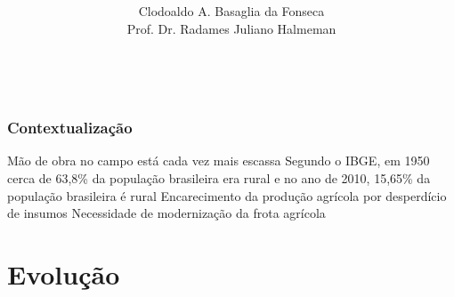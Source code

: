 \documentclass{beamer}
\title[\idsubjectcourseinstitution] %
{\texttt{\classnumber} \classtitle}
\subtitle{\classsubtitle}
\author[Clodoaldo da Fonseca] %
{\\\\Clodoaldo A. Basaglia da Fonseca \\Prof. Dr. Radames Juliano Halmeman
	\texttt{}\\
 \and
 \inst{}\\
    \texttt{}
}
\institute[] %
{
  \universityname \\
  \departmentname \\
  \citystatecountry
  \and
  \large
  \textbf{\coursename}
  
  \vspace{-1.0cm}
}
\date[\today] %
{\vspace{-1.5cm} \texttt{\subjectname}}
\begin{document}

{

	\vspace{0.5cm}
	\begin{frame}
		\maketitle
	\end{frame}
}


\vspace{0.5cm}





\begin{frame}
\frametitle{Contextualização}
\begin{outline}
 \1 Mão de obra no campo está cada vez mais escassa
 \2 Segundo o IBGE, em 1950 cerca de 63,8\% da população brasileira era rural e no ano de 2010,  15,65\% da população brasileira é rural
 \1 Encarecimento da produção agrícola por desperdício de insumos
 \1 Necessidade de modernização da frota agrícola
\end{outline}
\end{frame}

\section[]{Evolução}
\end{document}
